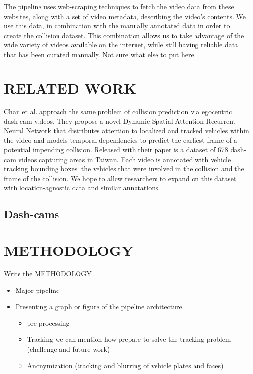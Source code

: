\documentclass[letterpaper, 10 pt, conference]{IEEEconf}
\newcommand{\todo}[1]{{\color{red}#1}}
\begin{document}
The pipeline uses web-scraping techniques to fetch the video data from these websites, along with a set of video metadata, describing the video's contents.
We use this data, in combination with the manually annotated data in order to create the collision dataset.
This combination allows us to take advantage of the wide variety of videos available on the internet, while still having reliable data that has been curated manually.
\todo{Not sure what else to put here}



\section{RELATED WORK}

Chan et al. \cite{chan2016anticipating} approach the same problem of collision prediction via egocentric dash-cam videos. They propose a novel Dynamic-Spatial-Attention Recurrent Neural Network that distributes attention to localized and tracked vehicles within the video and models temporal dependencies to predict the earliest frame of a potential impending collision. Released with their paper is a dataset of 678 dash-cam videos capturing areas in Taiwan. Each video is annotated with vehicle tracking bounding boxes, the vehicles that were involved in the collision and the frame of the collision. We hope to allow researchers to expand on this dataset with location-agnostic data and similar annotations.



\subsection{Dash-cams}%
\label{sub:dash_cams}







\section{METHODOLOGY}

\todo{Write the METHODOLOGY}
\begin{itemize}
  \item Major pipeline
  \item Presenting a graph or figure of the pipeline architecture
  \begin{itemize}
    \item pre-processing
    \item Tracking we can mention how prepare to solve the tracking problem (challenge and future work)
    \item Anonymization (tracking and blurring of vehicle plates and faces)
  \end{itemize}
\end{itemize}
\end{document}
